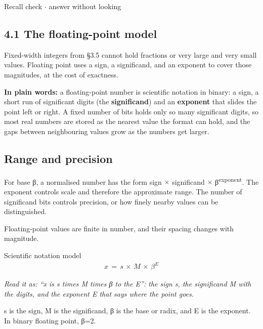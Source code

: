 \documentclass[11pt]{article}
\begin{document}
\begin{keepsection}
\begin{keepsection}
\begin{recallbox}{Recall check \ensuremath{\cdot} answer without looking}
\end{recallbox}
\end{keepsection}
\end{keepsection}

\begin{keepsection}
\section{4.1 The floating-point model}

Fixed-width integers from §3.5 cannot hold fractions or very large and very small values. Floating point uses a sign, a significand, and an exponent to cover those magnitudes, at the cost of exactness.

\begin{plainbox}\textbf{In plain words:} a floating-point number is scientific notation in binary: a sign, a short run of significant digits (the \textbf{significand}) and an \textbf{exponent} that slides the point left or right. A fixed number of bits holds only so many significant digits, so most real numbers are stored as the nearest value the format can hold, and the gaps between neighbouring values grow as the numbers get larger.\end{plainbox}

\begin{keepsection}
\subsection{Range and precision}

For base β, a normalised number has the form sign \ensuremath{\times} significand \ensuremath{\times} β\textsuperscript{exponent}. The exponent controls scale and therefore the approximate range. The number of significand bits controls precision, or how finely nearby values can be distinguished.

Floating-point values are finite in number, and their spacing changes with magnitude.

\begin{equationcard}{Scientific notation model}
\[ \begin{gathered} {x}\, =\, {s}\, \times \, {M}\, \times \, β^{{E}} \end{gathered} \]
{\small \emph{Read it as: “x is s times M times β to the E”: the sign s, the significand M with the digits, and the exponent E that says where the point goes.}\par s is the sign, M is the significand, β is the base or radix, and E is the exponent. In binary floating point, β=2.}
\end{equationcard}


\end{keepsection}
\end{keepsection}
\end{document}
